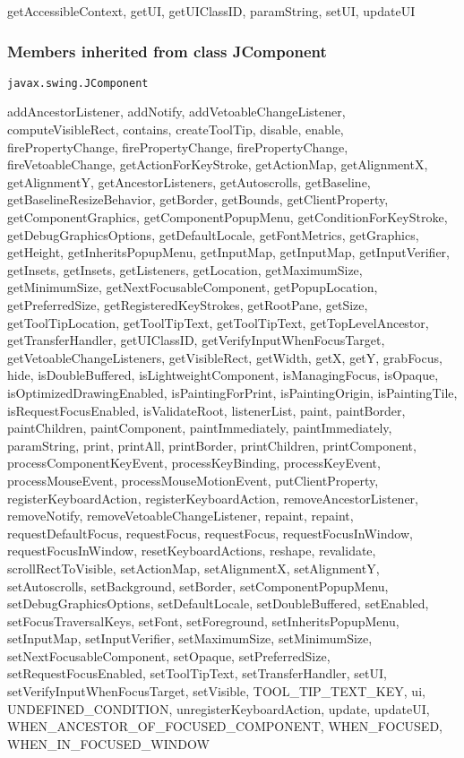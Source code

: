 {{{{{{{{{{{{{{{{{getAccessibleContext, getUI, getUIClassID, paramString, setUI, updateUI}
\subsubsection{Members inherited from class JComponent }{
\texttt{javax.swing.JComponent} {\small 
{}}
{\small 

addAncestorListener, addNotify, addVetoableChangeListener, computeVisibleRect, contains, createToolTip, disable, enable, firePropertyChange, firePropertyChange, firePropertyChange, fireVetoableChange, getActionForKeyStroke, getActionMap, getAlignmentX, getAlignmentY, getAncestorListeners, getAutoscrolls, getBaseline, getBaselineResizeBehavior, getBorder, getBounds, getClientProperty, getComponentGraphics, getComponentPopupMenu, getConditionForKeyStroke, getDebugGraphicsOptions, getDefaultLocale, getFontMetrics, getGraphics, getHeight, getInheritsPopupMenu, getInputMap, getInputMap, getInputVerifier, getInsets, getInsets, getListeners, getLocation, getMaximumSize, getMinimumSize, getNextFocusableComponent, getPopupLocation, getPreferredSize, getRegisteredKeyStrokes, getRootPane, getSize, getToolTipLocation, getToolTipText, getToolTipText, getTopLevelAncestor, getTransferHandler, getUIClassID, getVerifyInputWhenFocusTarget, getVetoableChangeListeners, getVisibleRect, getWidth, getX, getY, grabFocus, hide, isDoubleBuffered, isLightweightComponent, isManagingFocus, isOpaque, isOptimizedDrawingEnabled, isPaintingForPrint, isPaintingOrigin, isPaintingTile, isRequestFocusEnabled, isValidateRoot, listenerList, paint, paintBorder, paintChildren, paintComponent, paintImmediately, paintImmediately, paramString, print, printAll, printBorder, printChildren, printComponent, processComponentKeyEvent, processKeyBinding, processKeyEvent, processMouseEvent, processMouseMotionEvent, putClientProperty, registerKeyboardAction, registerKeyboardAction, removeAncestorListener, removeNotify, removeVetoableChangeListener, repaint, repaint, requestDefaultFocus, requestFocus, requestFocus, requestFocusInWindow, requestFocusInWindow, resetKeyboardActions, reshape, revalidate, scrollRectToVisible, setActionMap, setAlignmentX, setAlignmentY, setAutoscrolls, setBackground, setBorder, setComponentPopupMenu, setDebugGraphicsOptions, setDefaultLocale, setDoubleBuffered, setEnabled, setFocusTraversalKeys, setFont, setForeground, setInheritsPopupMenu, setInputMap, setInputVerifier, setMaximumSize, setMinimumSize, setNextFocusableComponent, setOpaque, setPreferredSize, setRequestFocusEnabled, setToolTipText, setTransferHandler, setUI, setVerifyInputWhenFocusTarget, setVisible, TOOL\_TIP\_TEXT\_KEY, ui, UNDEFINED\_CONDITION, unregisterKeyboardAction, update, updateUI, WHEN\_ANCESTOR\_OF\_FOCUSED\_COMPONENT, WHEN\_FOCUSED, WHEN\_IN\_FOCUSED\_WINDOW}
}}}}}}}}}}}}}}}}}
